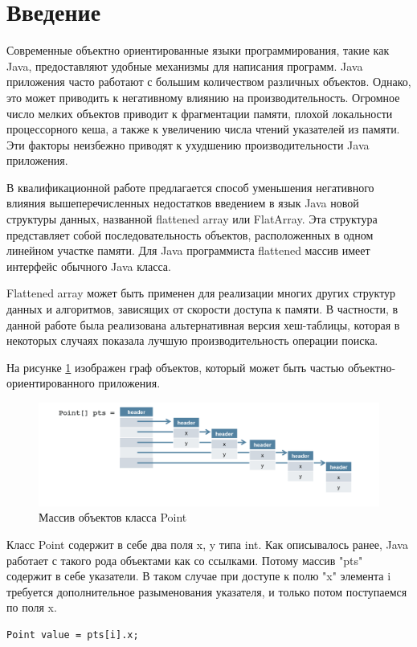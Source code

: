 \section{Введение}
Современные объектно ориентированные языки программирования, такие как Java, предоставляют удобные механизмы для написания программ. Java приложения часто работают с большим количеством различных объектов. 
Однако, это может приводить к негативному влиянию на производительность. Огромное число мелких объектов приводит к фрагментации памяти, плохой локальности процессорного кеша, а также к увеличению числа чтений указателей из памяти. Эти факторы неизбежно приводят к ухудшению производительности Java приложения.
\par
В квалификационной работе предлагается способ уменьшения негативного влияния вышеперечисленных недостатков введением в язык Java новой структуры данных, названной flattened array или FlatArray. Эта структура представляет собой последовательность объектов, расположенных в одном линейном участке памяти. 
Для Java программиста flattened массив имеет интерфейс обычного Java класса.
\par
Flattened array может быть применен для реализации многих других структур данных и алгоритмов, зависящих от скорости доступа к памяти. В частности, в данной работе была реализована альтернативная версия хеш-таблицы, которая в некоторых случаях показала лучшую производительность операции поиска.
\par
На рисунке \ref{ref-graph} изображен граф объектов, который может быть частью объектно-ориентированного приложения.
\begin{figure}[h]
	\includegraphics[width=0.95\linewidth]{image/reference.png}
	\caption{Массив объектов класса Point}\label{ref-graph}
\end{figure}
Класс Point содержит в себе два поля x, y типа int. Как описывалось ранее, Java работает с 
такого рода объектами как со ссылками. Потому массив "pts" содержит в себе указатели. В таком случае при доступе к полю "x" элемента i требуется дополнительное разыменования указателя, и только потом поступаемся по поля x.
\begin{lstlisting}
Point value = pts[i].x;
\end{lstlisting}
